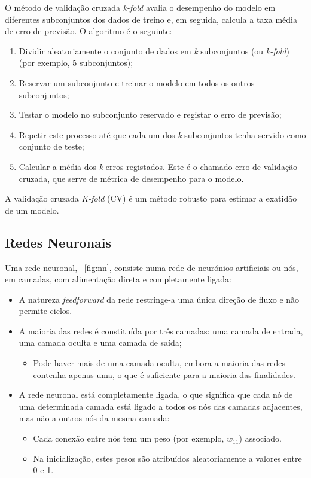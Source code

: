 \documentclass[conference]{IEEEtran}
\begin{document}
O método de validação cruzada \textit{k-fold} avalia o desempenho do modelo em diferentes subconjuntos dos dados de treino e, em seguida, calcula a taxa média de erro de previsão. O algoritmo é o seguinte:
\begin{enumerate}
	\item Dividir aleatoriamente o conjunto de dados em \textit{k} subconjuntos (ou \textit{k-fold}) (por exemplo, 5 subconjuntos);
	\item Reservar um subconjunto e treinar o modelo em todos os outros subconjuntos;
	\item Testar o modelo no subconjunto reservado e registar o erro de previsão;
	\item Repetir este processo até que cada um dos \textit{k} subconjuntos tenha servido como conjunto de teste; 
	\item Calcular a média dos \textit{k} erros registados. Este é o chamado erro de validação cruzada, que serve de métrica de desempenho para o modelo. 
\end{enumerate}

A validação cruzada \textit{K-fold} (CV) é um método robusto para estimar a exatidão de um modelo. \cite{madureira2024cv}

\subsection{Redes Neuronais}

Uma rede neuronal, \figurename~\ref{fig:nn}, consiste numa rede de neurónios artificiais ou nós, em camadas, com alimentação direta e completamente ligada:

\begin{itemize}
	\item A natureza \textit{feedforward} da rede restringe-a uma única direção de fluxo e não permite ciclos. 
	\item A maioria das redes é constituída por três camadas: uma camada de entrada, uma camada oculta e uma camada de saída; 
	\begin{itemize}
		\item Pode haver mais de uma camada oculta, embora a maioria das redes contenha apenas uma, o que é suficiente para a maioria das finalidades.
	\end{itemize}
	
	  
	\item  A rede neuronal está completamente ligada, o que significa que cada nó de uma determinada camada está ligado a todos os nós das camadas adjacentes, mas não a outros nós da mesma camada:
	\begin{itemize}
		\item Cada conexão entre nós tem um peso (por exemplo, $w_{11}$) associado.
		\item  Na inicialização, estes pesos são atribuídos aleatoriamente a valores entre 0 e 1. \cite{madureira2024nn}
	\end{itemize}
\end{itemize}
\end{document}
